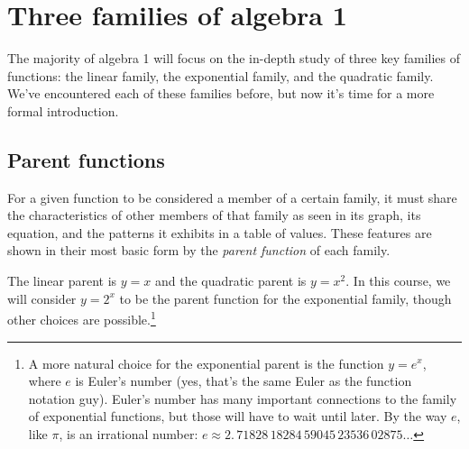 
\section{Three families of algebra 1}

The majority of algebra 1 will focus on the in-depth study of three key families of functions: the linear family, the exponential family, and the quadratic family. We've encountered each of these families before, but now it's time for a more formal introduction.

\begin{boxedexplore}
\end{boxedexplore}

\subsection{Parent functions}

For a given function to be considered a member of a certain family, it must share the characteristics of other members of that family as seen in its graph, its equation, and the patterns it exhibits in a table of values. These features are shown in their most basic form by the \textit{parent function} of each family.

The linear parent is $y=x$ and the quadratic parent is $y=x^2$. In this course, we will consider $y=2^x$ to be the parent function for the exponential family, though other choices are possible.\footnote{A more natural choice for the exponential parent is the function $y=e^x$, where $e$ is Euler's number (yes, that's the same Euler as the function notation guy). Euler's number has many important connections to the family of exponential functions, but those will have to wait until later. By the way $e$, like $\pi$, is an irrational number: $e \approx 2.\, 71828\, 18284\, 59045\, 23536\, 02875\dotso$}

